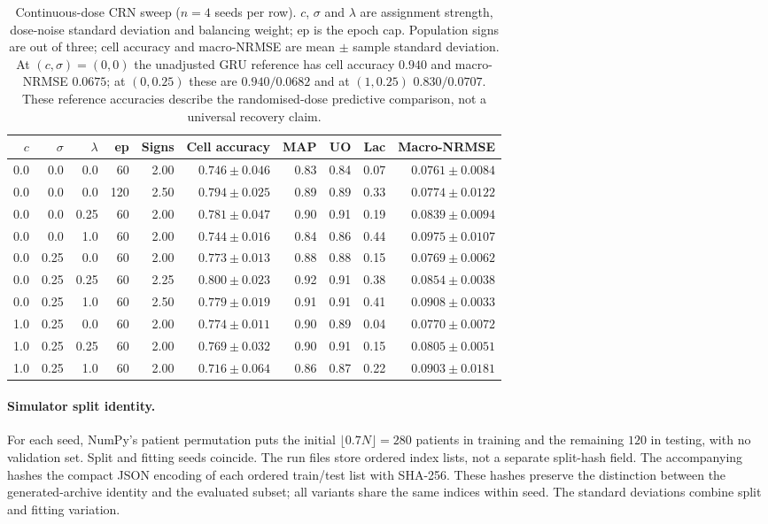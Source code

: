 \begin{table}[tbp]
\centering
\caption{Continuous-dose CRN sweep ($n=4$ seeds per row). $c$, $\sigma$ and $\lambda$ are assignment strength, dose-noise standard deviation and balancing weight; ep is the epoch cap. Population signs are out of three; cell accuracy and macro-NRMSE are mean $\pm$ sample standard deviation. At $(c,\sigma)=(0,0)$ the unadjusted GRU reference has cell accuracy $0.940$ and macro-NRMSE $0.0675$; at $(0,0.25)$ these are $0.940/0.0682$ and at $(1,0.25)$ $0.830/0.0707$. These reference accuracies describe the randomised-dose predictive comparison, not a universal recovery claim.}\label{tab:crnsweep}
\small
\begin{tabular}{rrrrrrrrrr}
\toprule
$c$ & $\sigma$ & $\lambda$ & ep & Signs & Cell accuracy & MAP & UO & Lac & Macro-NRMSE \\
\midrule
0.0 & 0.0 & 0.0 & 60 & 2.00 & $0.746\pm0.046$ & 0.83 & 0.84 & 0.07 & $0.0761\pm0.0084$ \\ 
0.0 & 0.0 & 0.0 & 120 & 2.50 & $0.794\pm0.025$ & 0.89 & 0.89 & 0.33 & $0.0774\pm0.0122$ \\ 
0.0 & 0.0 & 0.25 & 60 & 2.00 & $0.781\pm0.047$ & 0.90 & 0.91 & 0.19 & $0.0839\pm0.0094$ \\ 
0.0 & 0.0 & 1.0 & 60 & 2.00 & $0.744\pm0.016$ & 0.84 & 0.86 & 0.44 & $0.0975\pm0.0107$ \\ 
0.0 & 0.25 & 0.0 & 60 & 2.00 & $0.773\pm0.013$ & 0.88 & 0.88 & 0.15 & $0.0769\pm0.0062$ \\ 
0.0 & 0.25 & 0.25 & 60 & 2.25 & $0.800\pm0.023$ & 0.92 & 0.91 & 0.38 & $0.0854\pm0.0038$ \\ 
0.0 & 0.25 & 1.0 & 60 & 2.50 & $0.779\pm0.019$ & 0.91 & 0.91 & 0.41 & $0.0908\pm0.0033$ \\ 
1.0 & 0.25 & 0.0 & 60 & 2.00 & $0.774\pm0.011$ & 0.90 & 0.89 & 0.04 & $0.0770\pm0.0072$ \\ 
1.0 & 0.25 & 0.25 & 60 & 2.00 & $0.769\pm0.032$ & 0.90 & 0.91 & 0.15 & $0.0805\pm0.0051$ \\ 
1.0 & 0.25 & 1.0 & 60 & 2.00 & $0.716\pm0.064$ & 0.86 & 0.87 & 0.22 & $0.0903\pm0.0181$ \\ 
\bottomrule
\end{tabular}
\end{table}
\paragraph{Simulator split identity.}
For each seed, NumPy's patient permutation puts the initial $\lfloor0.7N\rfloor=280$ patients in training and the remaining $120$ in testing, with no validation set. Split and fitting seeds coincide. The run files store ordered index lists, not a separate split-hash field. The accompanying  hashes the compact JSON encoding of each ordered train/test list with SHA-256. These hashes preserve the distinction between the generated-archive identity and the evaluated subset; all variants share the same indices within seed. The standard deviations combine split and fitting variation.


